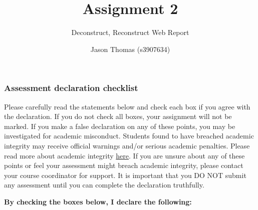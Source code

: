 \documentclass[
]{article}
\title{Assignment 2}
\subtitle{Deconstruct, Reconstruct Web Report}
\author{Jason Thomas (s3907634)}
\date{}
\begin{document}
\maketitle

\subsubsection{Assessment declaration
checklist}\label{assessment-declaration-checklist}

Please carefully read the statements below and check each box if you
agree with the declaration. If you do not check all boxes, your
assignment will not be marked. If you make a false declaration on any of
these points, you may be investigated for academic misconduct. Students
found to have breached academic integrity may receive official warnings
and/or serious academic penalties. Please read more about academic
integrity
\href{https://www.rmit.edu.au/students/student-essentials/assessment-and-exams/academic-integrity}{here}.
If you are unsure about any of these points or feel your assessment
might breach academic integrity, please contact your course coordinator
for support. It is important that you DO NOT submit any assessment until
you can complete the declaration truthfully.

\textbf{By checking the boxes below, I declare the following:}
\end{document}
